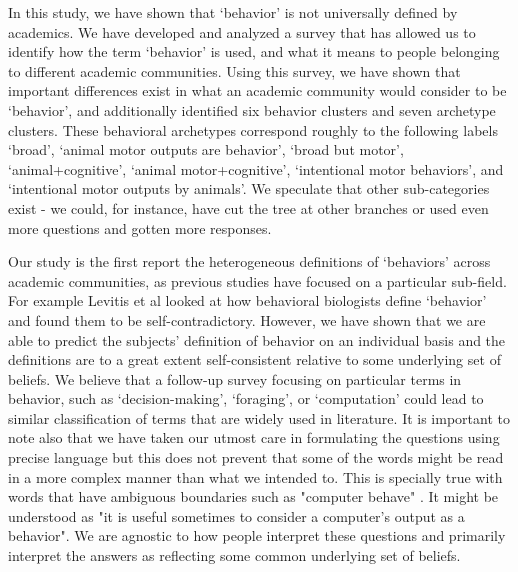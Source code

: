 \documentclass[a4paper, 11pt]{article}
\begin{document}
In this study, we have shown that `behavior' is not universally defined by academics. We have developed and analyzed a survey that has allowed us to identify how the term `behavior' is used, and what it means to people belonging to different academic communities. Using this survey, we have shown that important differences exist in what an academic community would consider to be `behavior', and additionally identified six behavior clusters and seven archetype clusters. These behavioral archetypes correspond roughly to the following labels `broad', `animal motor outputs are behavior', `broad but motor', `animal+cognitive', `animal motor+cognitive', `intentional motor behaviors', and `intentional motor outputs by animals'. We speculate that other sub-categories exist - we could, for instance, have cut the tree at other branches or used even more questions and gotten more responses. 

Our study is the first report the heterogeneous definitions of `behaviors' across academic communities, as previous studies have focused on a particular sub-field. For example Levitis et al \cite{levitis2009behavioural} looked at how behavioral biologists define `behavior' and found them to be self-contradictory. However, we have shown that we are able to predict the subjects' definition of behavior on an individual basis and the definitions are to a great extent self-consistent relative to some underlying set of beliefs. We believe that a follow-up survey focusing on particular terms in behavior, such as `decision-making', `foraging', or `computation' could lead to similar classification of terms that are widely used in literature. It is important to note also that we have taken our utmost care in formulating the questions using precise language but this does not prevent that some of the words might be  read in a more complex manner than what we intended to. This is specially true with words that have ambiguous boundaries such as "computer behave" . It might be understood as "it is useful sometimes to consider a computer's output as a behavior". We are agnostic to how people interpret these questions and primarily interpret the answers as reflecting some common underlying set of beliefs.
\end{document}
